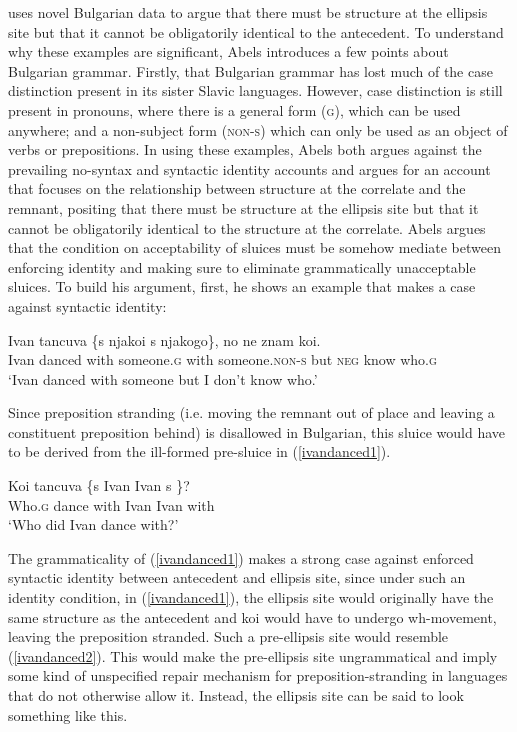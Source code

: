 \documentclass{turabian-researchpaper}
\begin{document}
\citet{abelsfitcondition} uses novel Bulgarian data to argue that there must be structure at the ellipsis site but that it cannot be obligatorily identical to the antecedent. To understand why these examples are significant, Abels introduces a few points about Bulgarian grammar. Firstly, that Bulgarian grammar has lost much of the case distinction present in its sister Slavic languages. However, case distinction is still present in pronouns, where there is a general form (\textsc{g}), which can be used anywhere; and a non-subject form (\textsc{non-s}) which can only be used as an object of verbs or prepositions. In using these examples, Abels both argues against the prevailing no-syntax and syntactic identity accounts and argues for an account that focuses on the relationship between structure at the correlate and the remnant, positing that there must be structure at the ellipsis site but that it cannot be obligatorily identical to the structure at the correlate. Abels argues that the condition on acceptability of sluices must be somehow mediate between enforcing identity and making sure to eliminate grammatically unacceptable sluices. 
To build his argument, first, he shows an example that makes a case against syntactic identity: 
\begin{exe}
\ex\label{ivandanced1}
\gll Ivan tancuva \{s njakoi \textbar s njakogo\}, no ne znam koi. \\
Ivan danced with someone.\textsc{g} with someone.\textsc{non-s} but \textsc{neg} know who.\textsc{g} \\
\trans `Ivan danced with someone but I don't know who.'
\end{exe}

Since preposition stranding (i.e. moving the remnant out of place and leaving a constituent preposition behind) is disallowed in Bulgarian, this sluice would have to be derived from the ill-formed pre-sluice in (\ref{ivandanced1}).

\begin{exe}
\ex\label{ivandanced2}
\gll *Koi tancuva \{s \underline{\hspace{1cm}} Ivan \textbar Ivan s \underline{\hspace{1cm}} \}? \\
Who.\textsc{g} dance with \hspace{1cm} Ivan Ivan with \\
\trans `Who did Ivan dance with?'
\end{exe}

The grammaticality of (\ref{ivandanced1}) makes a strong case against enforced syntactic identity between antecedent and ellipsis site, since under such an identity condition, in (\ref{ivandanced1}), the ellipsis site would originally have the same structure as the antecedent and koi would have to undergo wh-movement, leaving the preposition stranded. Such a pre-ellipsis site would resemble (\ref{ivandanced2}). This would make the pre-ellipsis site ungrammatical and imply some kind of unspecified repair mechanism for preposition-stranding in languages that do not otherwise allow it. Instead, the ellipsis site can be said to look something like this. 
\end{document}
